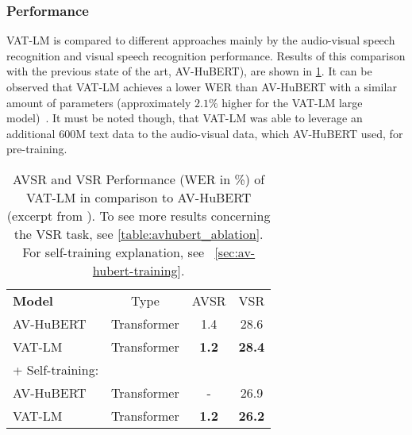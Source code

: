\subsubsection{Performance}
VAT-LM is compared to different approaches mainly by the audio-visual speech recognition and visual speech recognition performance. Results of this comparison with the previous state of the art, AV-HuBERT), are shown in \ref{table:vatlm_performance}. It can be observed that VAT-LM achieves a lower WER than AV-HuBERT with a similar amount of parameters (approximately $2.1\%$ higher for the VAT-LM large model)~\cite{vatlm}. It must be noted though, that VAT-LM was able to leverage an additional 600M text data to the audio-visual data, which AV-HuBERT used, for pre-training.

\begin{table}[h]
        \centering
        \begin{tabular}{l c c c}
        \hline
        \textbf{Model} & Type & AVSR & VSR\\
        AV-HuBERT&Transformer&1.4&28.6\\
        VAT-LM &Transformer&\textbf{1.2}&\textbf{28.4}\\
        \hline
        + Self-training:&&&\\
        AV-HuBERT&Transformer&-&26.9\\
        VAT-LM&Transformer&\textbf{1.2}&\textbf{26.2}\\
        \hline
        \end{tabular}
    \caption{\label{table:vatlm_performance}AVSR and VSR Performance (WER in \%) of VAT-LM in comparison to AV-HuBERT (excerpt from \cite{vatlm}). To see more results concerning the VSR task, see \ref{table:avhubert_ablation}. For self-training explanation, see ~\ref{sec:av-hubert-training}.}
\end{table}